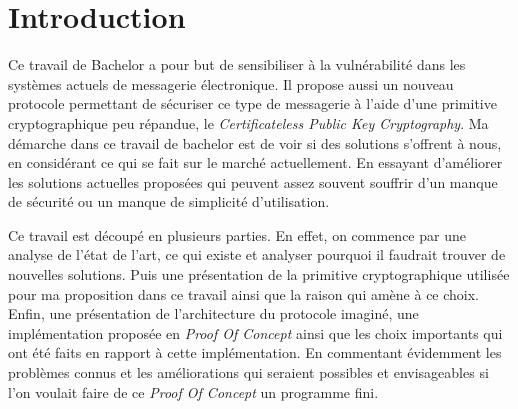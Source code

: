 \chapter{Introduction}
\label{ch:intro}

Ce travail de Bachelor a pour but de sensibiliser à la vulnérabilité dans les systèmes actuels de messagerie électronique. Il propose aussi un nouveau protocole permettant de sécuriser ce type de messagerie à l'aide d'une primitive cryptographique peu répandue, le \textit{Certificateless Public Key Cryptography}. Ma démarche dans ce travail de bachelor est de voir si des solutions s'offrent à nous, en considérant ce qui se fait sur le marché actuellement. En essayant d'améliorer les solutions actuelles proposées qui peuvent assez souvent souffrir d'un manque de sécurité ou un manque de simplicité d'utilisation.

Ce travail est découpé en plusieurs parties. En effet, on commence par une analyse de l'état de l'art, ce qui existe et analyser pourquoi il faudrait trouver de nouvelles solutions. Puis une présentation de la primitive cryptographique utilisée pour ma proposition dans ce travail ainsi que la raison qui amène à ce choix. Enfin, une présentation de l'architecture du protocole imaginé, une implémentation proposée en \textit{Proof Of Concept} ainsi que les choix importants qui ont été faits en rapport à cette implémentation. En commentant évidemment les problèmes connus et les améliorations qui seraient possibles et envisageables si l'on voulait faire de ce \textit{Proof Of Concept} un programme fini.